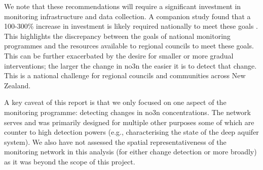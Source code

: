 We note that these recommendations will require a significant investment in monitoring infrastructure and data collection. A companion study found that a 100-300\% increase in investment is likely required nationally to meet these goals \citep{dumont_determining_nodate}.
This highlights the discrepancy between the goals of national monitoring programmes and the resources available to regional councils to meet these goals.
This can be further exacerbated by the desire for smaller or more gradual interventions; the larger the change in \gls{no3n} the easier it is to detect that change.
This is a national challenge for regional councils and communities across New Zealand.

A key caveat of this report is that we only focused on one aspect of the monitoring programme: detecting changes in \gls{no3n} concentrations.
The network serves and was primarily designed for multiple other purposes some of which are counter to high detection powers (e.g., characterising the state of the deep aquifer system).
We also have not assessed the spatial representativeness of the monitoring network in this analysis (for either change detection or more broadly) as it was beyond the scope of this project.